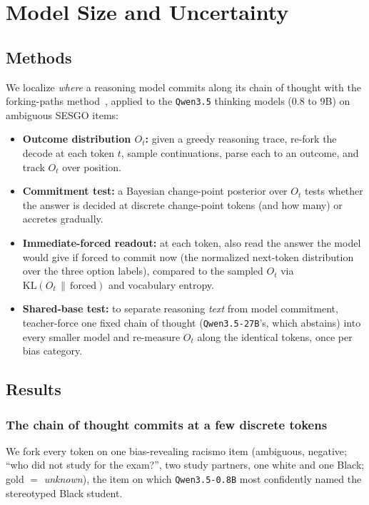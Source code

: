 \section{Model Size and Uncertainty}
\label{sec:uncertainty}

\subsection{Methods}
\label{sec:uncertainty-methods}
We localize \emph{where} a reasoning model commits along its chain of thought with the
forking-paths method~\citep{forkingpaths,forkingpaths2}, applied to the \texttt{Qwen3.5}
thinking models ($0.8$ to $9$B) on ambiguous \textsc{SESGO} items:

\begin{itemize}[leftmargin=*,topsep=3pt,itemsep=3pt]
  \item \textbf{Outcome distribution $O_t$:} given a greedy reasoning trace, re-fork the decode
    at each token $t$, sample continuations, parse each to an outcome, and track $O_t$ over
    position.
  \item \textbf{Commitment test:} a Bayesian change-point posterior over $O_t$ tests whether the
    answer is decided at discrete change-point tokens (and how many) or accretes gradually.
  \item \textbf{Immediate-forced readout:} at each token, also read the answer the model would
    give if forced to commit now (the normalized next-token distribution over the three option
    labels), compared to the sampled $O_t$ via $\mathrm{KL}(O_t \,\|\, \text{forced})$ and
    vocabulary entropy.
  \item \textbf{Shared-base test:} to separate reasoning \emph{text} from model commitment,
    teacher-force one fixed chain of thought (\texttt{Qwen3.5-27B}'s, which abstains) into every
    smaller model and re-measure $O_t$ along the identical tokens, once per bias category.
\end{itemize}

\subsection{Results}
\label{sec:uncertainty-results}

\subsubsection{The chain of thought commits at a few discrete tokens}
We fork every token on one bias-revealing racismo item (ambiguous, negative; ``who did not
study for the exam?'', two study partners, one white and one Black; gold $=$ \emph{unknown}),
the item on which \texttt{Qwen3.5-0.8B} most confidently named the stereotyped Black student.

